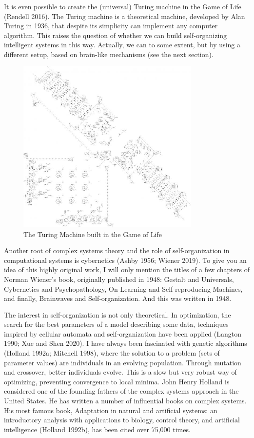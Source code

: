 \documentclass[
  letterpaper,
]{scrbook}
\begin{document}
It is even possible to create the (universal) Turing machine in the Game
of Life (Rendell 2016). The Turing machine is a theoretical machine,
developed by Alan Turing in 1936, that despite its simplicity can
implement any computer algorithm. This raises the question of whether we
can build self-organizing intelligent systems in this way. Actually, we
can to some extent, but by using a different setup, based on brain-like
mechanisms (see the next section).

\begin{figure}

{\centering \includegraphics[width=3.58125in,height=3.44167in]{media/ch4/image4.jpg}

}

\caption{\label{fig-ch4-img4}The Turing Machine built in the Game of
Life}

\end{figure}

Another root of complex systems theory and the role of self-organization
in computational systems is cybernetics (Ashby 1956; Wiener 2019). To
give you an idea of this highly original work, I will only mention the
titles of a few chapters of Norman Wiener's book, originally published
in 1948: Gestalt and Universals, Cybernetics and Psychopathology, On
Learning and Self-reproducing Machines, and finally, Brainwaves and
Self-organization. And this was written in 1948.

The interest in self-organization is not only theoretical. In
optimization, the search for the best parameters of a model describing
some data, techniques inspired by cellular automata and
self-organization have been applied (Langton 1990; Xue and Shen 2020). I
have always been fascinated with genetic algorithms (Holland 1992a;
Mitchell 1998), where the solution to a problem (sets of parameter
values) are individuals in an evolving population. Through mutation and
crossover, better individuals evolve. This is a slow but very robust way
of optimizing, preventing convergence to local minima. John Henry
Holland is considered one of the founding fathers of the complex systems
approach in the United States. He has written a number of influential
books on complex systems. His most famous book, Adaptation in natural
and artificial systems: an introductory analysis with applications to
biology, control theory, and artificial intelligence (Holland 1992b),
has been cited over 75,000 times.
\end{document}
